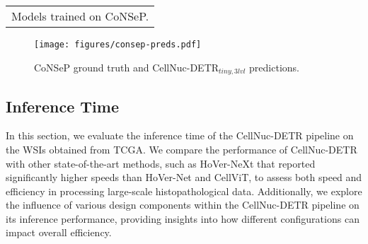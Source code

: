 \begin{table}[ht]
\begin{adjustbox}{width=0.9\textwidth}
\begin{tabular}{l|ccccc|c}

\bottomrule

\multicolumn{7}{l}{\small *Models trained on CoNSeP.}

\end{tabular}
\end{adjustbox}
\vskip -0.15in
\end{table}

\begin{figure}
    \centering
    \texttt{[image: figures/consep-preds.pdf]}
    \caption{CoNSeP ground truth and CellNuc-DETR$_{tiny,3lvl}$ predictions.}
    \label{fig:results:consep}
\end{figure}

\subsection{Inference Time}
\label{sec:results:time}

In this section, we evaluate the inference time of the CellNuc-DETR pipeline on the WSIs obtained from TCGA. We compare the performance of CellNuc-DETR with other state-of-the-art methods, such as HoVer-NeXt that reported significantly higher speeds than HoVer-Net and CellViT, to assess both speed and efficiency in processing large-scale histopathological data. Additionally, we explore the influence of various design components within the CellNuc-DETR pipeline on its inference performance, providing insights into how different configurations can impact overall efficiency.


